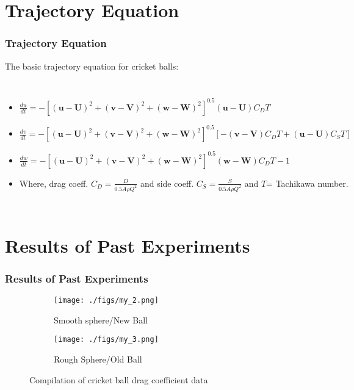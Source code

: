 \documentclass{beamer}
\renewcommand{\vec}[1]{\mathbf{#1}}
\begin{document}
\section{Trajectory Equation}
\begin{frame}
\frametitle{Trajectory Equation}
The basic trajectory equation for cricket balls:\\
\begin{columns}
  \begin{itemize}
  \item 
  $\frac{du}{dt}=-[(\vec{u}-\vec{U})^2+(\vec{v}-\vec{V})^2+(\vec{w}-\vec{W})^2]^{0.5}(\vec{u}-\vec{U})C_D T$
  
  \item $\frac{dv}{dt}=-[(\vec{u}-\vec{U})^2+(\vec{v}-\vec{V})^2+(\vec{w}-\vec{W})^2]^{0.5}[-(\vec{v}-\vec{V})C_D T+(\vec{u}-\vec{U})C_S T]$
  
  \item $\frac{dw}{dt}=-[(\vec{u}-\vec{U})^2+(\vec{v}-\vec{V})^2+(\vec{w}-\vec{W})^2]^{0.5}(\vec{w}-\vec{W})C_D T - 1$
  
  \item Where, drag coeff. $C_D = \frac{D}{0.5A \rho Q^2}$ and side coeff. $C_S = \frac{S}{0.5A \rho Q^2}$ and $T$= Tachikawa number.
%  
  
  \end{itemize}
\end{columns}


\end{frame}

\section{Results of Past Experiments}
\begin{frame}
\frametitle{Results of Past Experiments}

\begin{figure}[h!]
  \centering
  \begin{subfigure}[b]{0.4\linewidth}
    \texttt{[image: ./figs/my\_2.png]}
    \caption{Smooth sphere/New Ball}
  \end{subfigure}
  \begin{subfigure}[b]{0.4\linewidth}
    \texttt{[image: ./figs/my\_3.png]}
    \caption{Rough Sphere/Old Ball}
  \end{subfigure}
  \caption{Compilation of cricket ball drag coefficient data}
  \label{fig:drag1}
\end{figure}
\end{frame}
\end{document}
